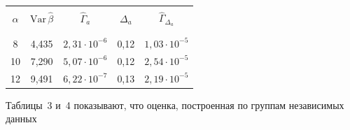 \begin{table}\small %


\begin{center}


\parbox{210pt}{





}





\vspace*{2ex}





\begin{tabular}{|c|c|c|c|c|}


\hline


&&&&\\[-9pt]


$\alpha$& $\mathrm{Var}\, \hat{\beta}$ &  ${\hat\Gamma}_{a}$  & ${\Delta}_{a}$ & 


${\hat\Gamma}_{{\Delta}_{a}}$ \\  


&&&&\\[-9pt]


\hline


&&&&\\[-9pt]


 \hphantom{9}8 & 4,435 &  $2{,}31\cdot 10^{-6} $&  0,12 & $1{,}03 \cdot 10^{-5}$  \\




 10&7,290& $5{,}07 \cdot 10^{-6} $&  0,12 & $2{,}54 \cdot 10^{-5} $\\




 12&9,491&$ 6{,}22 \cdot 10^{-7}$ &  0,13 & $2{,}19 \cdot 10^{-5}$  \\


\hline


\end{tabular}


\end{center}


\vspace*{-9pt}


\end{table}





Таблицы~3 и~4 показывают, что оценка, построенная по группам независимых данных  


